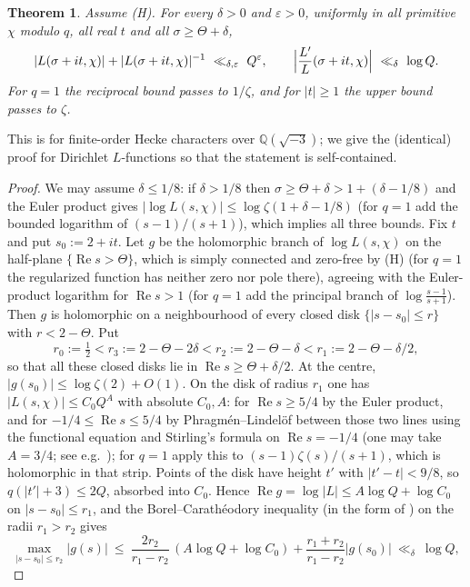 \documentclass[11pt]{article}
\newtheorem{theorem}{Theorem}
\renewcommand{\Re}{\operatorname{Re}}
\begin{document}
\begin{theorem}\label{thm:main}
Assume (H). For every $\delta>0$ and $\varepsilon>0$, uniformly in all primitive $\chi$ modulo $q$, all real $t$ and all $\sigma\ge\Theta+\delta$,
\[
|L(\sigma+it,\chi)|+|L(\sigma+it,\chi)|^{-1}\ \ll_{\delta,\varepsilon}\ Q^{\varepsilon},\qquad
\Bigl|\frac{L'}{L}(\sigma+it,\chi)\Bigr|\ \ll_{\delta}\ \log Q .
\]
For $q=1$ the reciprocal bound passes to $1/\zeta$, and for $|t|\ge1$ the upper bound passes to $\zeta$.
\end{theorem}

This is \cite[Lemma~4.9, ``global assertion'']{Ope26} for finite-order Hecke characters over $\mathbb Q(\sqrt{-3})$; we give the (identical) proof for Dirichlet $L$-functions so that the statement is self-contained.

\begin{proof}
We may assume $\delta\le1/8$: if $\delta>1/8$ then $\sigma\ge\Theta+\delta>1+(\delta-1/8)$ and the Euler product gives $|\log L(s,\chi)|\le\log\zeta(1+\delta-1/8)$ (for $q=1$ add the bounded logarithm of $(s-1)/(s+1)$), which implies all three bounds. Fix $t$ and put $s_0:=2+it$. Let $g$ be the holomorphic branch of $\log L(s,\chi)$ on the half-plane $\{\Re s>\Theta\}$, which is simply connected and zero-free by (H) (for $q=1$ the regularized function has neither zero nor pole there), agreeing with the Euler-product logarithm for $\Re s>1$ (for $q=1$ add the principal branch of $\log\frac{s-1}{s+1}$). Then $g$ is holomorphic on a neighbourhood of every closed disk $\{|s-s_0|\le r\}$ with $r<2-\Theta$. Put
\[
r_0:=\tfrac12<r_3:=2-\Theta-2\delta<r_2:=2-\Theta-\delta<r_1:=2-\Theta-\delta/2 ,
\]
so that all these closed disks lie in $\Re s\ge\Theta+\delta/2$. At the centre, $|g(s_0)|\le\log\zeta(2)+O(1)$. On the disk of radius $r_1$ one has $|L(s,\chi)|\le C_0Q^{A}$ with absolute $C_0,A$: for $\Re s\ge5/4$ by the Euler product, and for $-1/4\le\Re s\le5/4$ by Phragm\'en--Lindel\"of between those two lines using the functional equation and Stirling's formula on $\Re s=-1/4$ (one may take $A=3/4$; see e.g.\ \cite[Ch.~10]{MV}); for $q=1$ apply this to $(s-1)\zeta(s)/(s+1)$, which is holomorphic in that strip. Points of the disk have height $t'$ with $|t'-t|<9/8$, so $q(|t'|+3)\le2Q$, absorbed into $C_0$. Hence $\Re g=\log|L|\le A\log Q+\log C_0$ on $|s-s_0|\le r_1$, and the Borel--Carath\'eodory inequality (in the form of \cite[\S5.5]{TitF}) on the radii $r_1>r_2$ gives
\[
\max_{|s-s_0|\le r_2}|g(s)|\ \le\ \frac{2r_2}{r_1-r_2}\,(A\log Q+\log C_0)+\frac{r_1+r_2}{r_1-r_2}|g(s_0)|\ \ll_\delta\ \log Q ,
\]
\end{proof}
\end{document}
